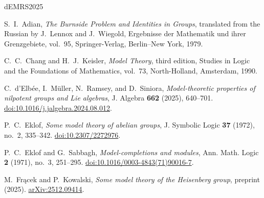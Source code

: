\documentclass[11pt,reqno]{article}
\theoremstyle{definition}
\theoremstyle{remark}
\begin{document}


% 
% 

\begin{thebibliography}{dEMRS2025}

S.~I.~Adian,
\emph{The Burnside Problem and Identities in Groups},
translated from the Russian by J.~Lennox and J.~Wiegold,
Ergebnisse der Mathematik und ihrer Grenzgebiete, vol.~95,
Springer-Verlag, Berlin--New York, 1979.

C.~C.~Chang and H.~J.~Keisler,
\emph{Model Theory},
third edition,
Studies in Logic and the Foundations of Mathematics, vol.~73,
North-Holland, Amsterdam, 1990.

C.~d'Elb\'ee, I.~M\"uller, N.~Ramsey, and D.~Siniora,
\emph{Model-theoretic properties of nilpotent groups and Lie algebras},
J. Algebra \textbf{662} (2025), 640--701.
\href{https://doi.org/10.1016/j.jalgebra.2024.08.012}
     {doi:10.1016/j.jalgebra.2024.08.012}.

P.~C.~Eklof,
\emph{Some model theory of abelian groups},
J. Symbolic Logic \textbf{37} (1972), no.~2, 335--342.
\href{https://doi.org/10.2307/2272976}
     {doi:10.2307/2272976}.


P.~C.~Eklof and G.~Sabbagh,
\emph{Model-completions and modules},
Ann. Math. Logic \textbf{2} (1971), no.~3, 251--295.
\href{https://doi.org/10.1016/0003-4843(71)90016-7}
     {doi:10.1016/0003-4843(71)90016-7}.

M.~Fr\k{a}cek and P.~Kowalski,
\emph{Some model theory of the Heisenberg group},
preprint (2025).
\href{https://arxiv.org/abs/2512.09414}{arXiv:2512.09414}.


\end{thebibliography}
\end{document}
